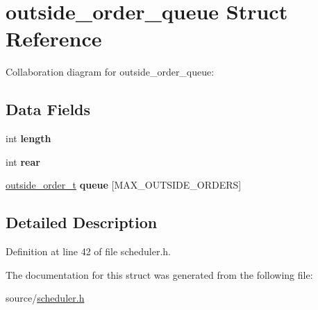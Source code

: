 \hypertarget{structoutside__order__queue}{}\section{outside\+\_\+order\+\_\+queue Struct Reference}
\label{structoutside__order__queue}


Collaboration diagram for outside\+\_\+order\+\_\+queue\+:
\subsection*{Data Fields}
\begin{DoxyCompactItemize}
\item 
\mbox{\label{structoutside__order__queue_a8259fe8daf9f79a1acb9523b5750bd77}} 
int {\bfseries length}
\item 
\mbox{\label{structoutside__order__queue_af5116728b6d122a7b020ed4bd1a32f1b}} 
int {\bfseries rear}
\item 
\mbox{\label{structoutside__order__queue_a42fc224e7f768fb3b882628d8c052ca4}} 
\hyperlink{structoutside__order}{outside\+\_\+order\+\_\+t} {\bfseries queue} \mbox{[}M\+A\+X\+\_\+\+O\+U\+T\+S\+I\+D\+E\+\_\+\+O\+R\+D\+E\+RS\mbox{]}
\end{DoxyCompactItemize}


\subsection{Detailed Description}


Definition at line 42 of file scheduler.\+h.



The documentation for this struct was generated from the following file\+:\begin{DoxyCompactItemize}
\item 
source/\hyperlink{scheduler_8h}{scheduler.\+h}\end{DoxyCompactItemize}
